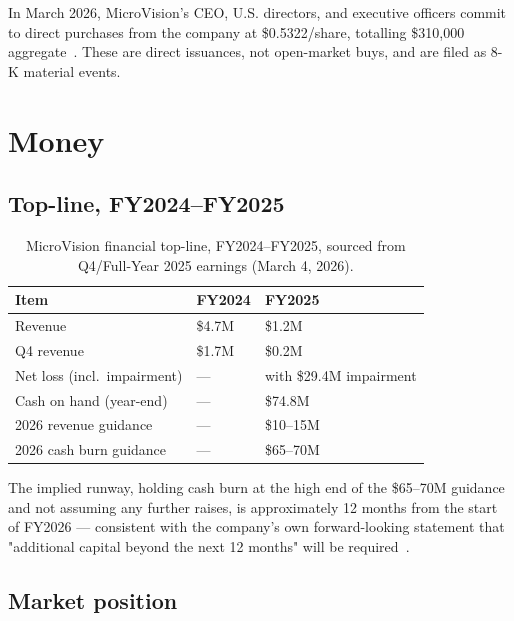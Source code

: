 \documentclass[10pt,letterpaper,twocolumn]{article}
\begin{document}
In March 2026, MicroVision's CEO, U.S. directors, and executive officers commit to direct purchases from the company at \$0.5322/share, totalling \$310{,}000 aggregate~\citep{stocktitan2026insiders}. These are direct issuances, not open-market buys, and are filed as 8-K material events.

\section{Money}\label{sec:money}

\subsection{Top-line, FY2024--FY2025}

\begin{table}[h]
\footnotesize
\centering
\setlength{\tabcolsep}{4pt}
\begin{tabularx}{\columnwidth}{lXX}
\toprule
\textbf{Item} & \textbf{FY2024} & \textbf{FY2025} \\
\midrule
Revenue & \$4.7M & \$1.2M \\
Q4 revenue & \$1.7M & \$0.2M \\
Net loss (incl.\ impairment) & --- & with \$29.4M impairment \\
Cash on hand (year-end) & --- & \$74.8M \\
2026 revenue guidance & --- & \$10--15M \\
2026 cash burn guidance & --- & \$65--70M \\
\bottomrule
\end{tabularx}
\caption{MicroVision financial top-line, FY2024--FY2025, sourced from Q4/Full-Year 2025 earnings (March 4, 2026).}
\label{tab:financials}
\end{table}

The implied runway, holding cash burn at the high end of the \$65--70M guidance and not assuming any further raises, is approximately 12 months from the start of FY2026 --- consistent with the company's own forward-looking statement that "additional capital beyond the next 12 months" will be required~\citep{seekingalpha2026guidance}.

\subsection{Market position}
\end{document}
